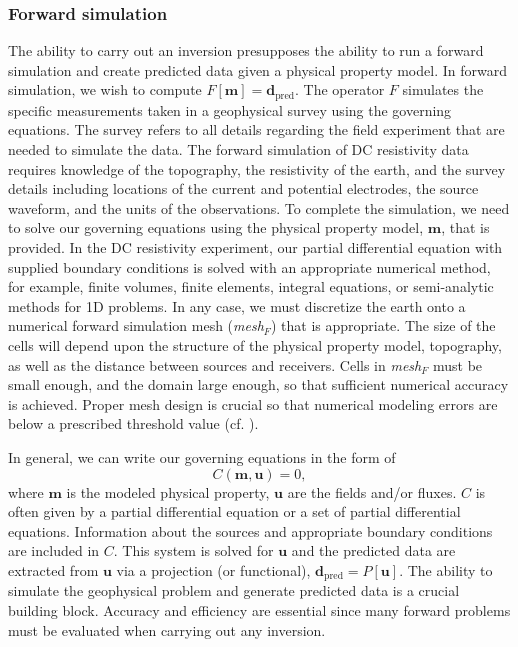 \documentclass[preprint,review,3p,times,onecolumn,authoryear]{elsarticle}
\newcommand{\m}{\mathbf{m}}
\newcommand{\dpred}{\mathbf{d}_\text{pred}}
\newcommand{\meshF}{\emph{mesh}$_F$\xspace}
\renewcommand {\u}  { {\mathbf u} }
\begin{document}
\subsubsection*{Forward simulation}
The ability to carry out an inversion presupposes the ability to run a
forward simulation and create predicted data given a physical property model.
In forward simulation, we wish to compute $F[\m]=\dpred$. The operator $F$
simulates the specific measurements taken in a geophysical survey using the governing equations.
The survey refers to all details regarding the field experiment that are needed
to simulate the data. The forward simulation
of DC resistivity data requires knowledge of the topography, the resistivity of the earth,
and the survey details including locations of the current and potential electrodes, the source waveform, and
the units of the observations. %
To complete the simulation, we need to solve our governing equations
using the physical property model, $\m$, that is provided.
In the DC resistivity experiment, our partial differential equation with supplied boundary conditions
is solved with an appropriate numerical method, for example, finite volumes, finite elements, integral equations,
or semi-analytic methods for 1D problems.
In any case, we must discretize the earth onto a numerical forward simulation mesh (\meshF) that is appropriate.
The size of the cells will depend upon the structure of the physical property model, topography,
as well as the distance between sources and receivers.
Cells in \meshF must be small enough, and the domain large enough,
so that sufficient numerical accuracy is achieved.
Proper mesh design is crucial so that numerical modeling errors are below a prescribed threshold value (cf. \cite{haber2015computational}).


In general, we can write our governing equations in the form of
{%
\begin{equation}
\label{eq:fwdmodel}
C(\m,\u) = 0,
\end{equation}
}
where $\m$ is the modeled physical property, $\u$ are the fields and/or fluxes.
$C$ is often given by a partial differential equation or a set of partial
differential equations. Information about the sources and appropriate boundary
conditions are included in $C$. This system is solved for $\u$
and the predicted data are extracted from $\u$ via a projection (or functional), $\dpred = P[\u]$.
The ability to simulate the geophysical problem and generate predicted data
is a crucial building block. Accuracy and efficiency are essential since many
forward problems must be evaluated when carrying out any inversion.
\end{document}

